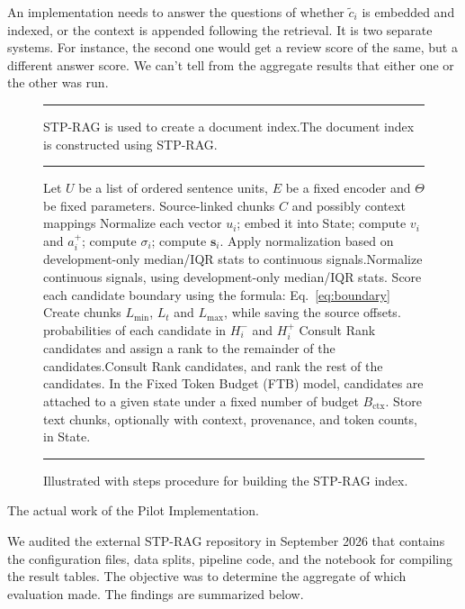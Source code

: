 \documentclass[10pt,a4paper]{article}
\begin{document}
An implementation needs to answer the questions of whether $\tilde c_i$ is embedded and indexed, or the context is appended following the retrieval. It is two separate systems. For instance, the second one would get a review score of the same, but a different answer score. We can't tell from the aggregate results that either one or the other was run.

\begin{figure}[!htbp]
\centering
\begin{minipage}{0.96\textwidth}
\hrule\smallskip
STP-RAG is used to create a document index.The document index is constructed using STP-RAG.
\smallskip\hrule\smallskip
\footnotesize
\begin{algorithmic}[1]
\State Let $U$ be a list of ordered sentence units, $E$ be a fixed encoder and $\Theta$ be fixed parameters.
\Ensure Source-linked chunks $C$ and possibly context mappings
\State Normalize each vector $u_i$; embed it into State; compute $v_i$ and $a_i^+$; compute $\sigma_i$; compute $\mathbf{s}_i$.
\State Apply normalization based on development-only median/IQR stats to continuous signals.Normalize continuous signals, using development-only median/IQR stats.
\State Score each candidate boundary using the formula: Eq.~\eqref{eq:boundary}
\State Create chunks $L_{\min}$, $L_t$ and $L_{\max}$, while saving the source offsets.
    \State probabilities of each candidate in $H^-_i$ and $H^+_i$
    \State Consult Rank candidates and assign a rank to the remainder of the candidates.Consult Rank candidates, and rank the rest of the candidates.
    \State In the Fixed Token Budget (FTB) model, candidates are attached to a given state under a fixed number of budget $B_{\mathrm{ctx}}$.
  \EndIf
  \State Store text chunks, optionally with context, provenance, and token counts, in State.
\EndFor
\end{algorithmic}
\smallskip\hrule
\end{minipage}
\caption{Illustrated with steps procedure for building the STP-RAG index.}
\label{fig:algorithm}
\end{figure}

The actual work of the Pilot Implementation.
\label{sec:audit}

We audited the external STP-RAG repository in September 2026 that contains the configuration files, data splits, pipeline code, and the notebook for compiling the result tables. The objective was to determine the aggregate of which evaluation made. The findings are summarized below.
\end{document}
